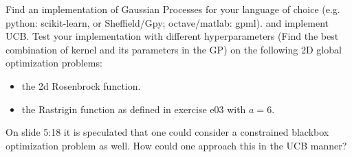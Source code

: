 

\renewcommand{\course}{Optimization}
\renewcommand{\coursepicture}{optim}
\renewcommand{\coursedate}{Summer 2015}
\renewcommand{\exnum}{8}

\exercises
{}
\exercisestitle



Find an implementation of Gaussian Processes for your language of choice (e.g.
python: scikit-learn, or Sheffield/Gpy; octave/matlab: gpml).  and implement
UCB.  Test your implementation with different hyperparameters (Find the best
combination of kernel and its parameters in the GP) on the following 2D global
optimization problems:
\begin{itemize}
  \item the 2d Rosenbrock function.
  \item the Rastrigin function as defined in exercise e03 with $a=6$.
\end{itemize}



On slide 5:18 it is speculated that one could consider a constrained
blackbox optimization problem as well. How could one approach this in
the UCB manner?


\exerfoot

